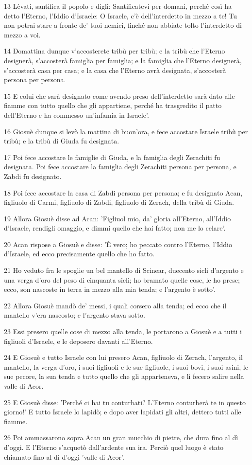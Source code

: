 \par 13 Lèvati, santifica il popolo e digli: Santificatevi per domani, perché così ha detto l'Eterno, l'Iddio d'Israele: O Israele, c'è dell'interdetto in mezzo a te! Tu non potrai stare a fronte de' tuoi nemici, finché non abbiate tolto l'interdetto di mezzo a voi.
\par 14 Domattina dunque v'accosterete tribù per tribù; e la tribù che l'Eterno designerà, s'accosterà famiglia per famiglia; e la famiglia che l'Eterno designerà, s'accosterà casa per casa; e la casa che l'Eterno avrà designata, s'accosterà persona per persona.
\par 15 E colui che sarà designato come avendo preso dell'interdetto sarà dato alle fiamme con tutto quello che gli appartiene, perché ha trasgredito il patto dell'Eterno e ha commesso un'infamia in Israele'.
\par 16 Giosuè dunque si levò la mattina di buon'ora, e fece accostare Israele tribù per tribù; e la tribù di Giuda fu designata.
\par 17 Poi fece accostare le famiglie di Giuda, e la famiglia degli Zerachiti fu designata. Poi fece accostare la famiglia degli Zerachiti persona per persona, e Zabdi fu designato.
\par 18 Poi fece accostare la casa di Zabdi persona per persona; e fu designato Acan, figliuolo di Carmi, figliuolo di Zabdi, figliuolo di Zerach, della tribù di Giuda.
\par 19 Allora Giosuè disse ad Acan: 'Figliuol mio, da' gloria all'Eterno, all'Iddio d'Israele, rendigli omaggio, e dimmi quello che hai fatto; non me lo celare'.
\par 20 Acan rispose a Giosuè e disse: 'È vero; ho peccato contro l'Eterno, l'Iddio d'Israele, ed ecco precisamente quello che ho fatto.
\par 21 Ho veduto fra le spoglie un bel mantello di Scinear, duecento sicli d'argento e una verga d'oro del peso di cinquanta sicli; ho bramato quelle cose, le ho prese; ecco, son nascoste in terra in mezzo alla mia tenda; e l'argento è sotto'.
\par 22 Allora Giosuè mandò de' messi, i quali corsero alla tenda; ed ecco che il mantello v'era nascosto; e l'argento stava sotto.
\par 23 Essi presero quelle cose di mezzo alla tenda, le portarono a Giosuè e a tutti i figliuoli d'Israele, e le deposero davanti all'Eterno.
\par 24 E Giosuè e tutto Israele con lui presero Acan, figliuolo di Zerach, l'argento, il mantello, la verga d'oro, i suoi figliuoli e le sue figliuole, i suoi bovi, i suoi asini, le sue pecore, la sua tenda e tutto quello che gli apparteneva, e li fecero salire nella valle di Acor.
\par 25 E Giosuè disse: 'Perché ci hai tu conturbati? L'Eterno conturberà te in questo giorno!' E tutto Israele lo lapidò; e dopo aver lapidati gli altri, dettero tutti alle fiamme.
\par 26 Poi ammassarono sopra Acan un gran mucchio di pietre, che dura fino al dì d'oggi. E l'Eterno s'acquetò dall'ardente sua ira. Perciò quel luogo è stato chiamato fino al dì d'oggi 'valle di Acor'.

